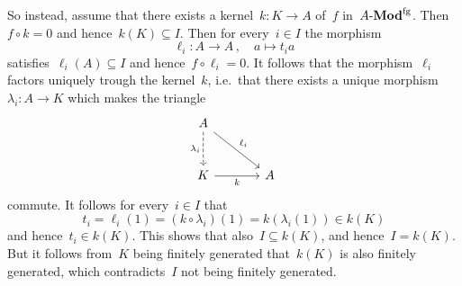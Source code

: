 \begin{example}
\begin{enumerate}
      So instead, assume that there exists a kernel~$k \colon K \to A$ of~$f$ in~$\text{$A$-$\mathbf{Mod}^{\mathrm{fg}}$}$.
      Then~$f \circ k = 0$ and hence~$k(K) \subseteq I$.
      Then for every~$i \in I$ the morphism
      \[
                \ell_i
        \colon  A
        \to     A \,,
        \quad   a
        \mapsto t_i a
      \]
      satisfies~$\ell_i(A) \subseteq I$ and hence~$f \circ \ell_i = 0$.
      It follows that the morphism~$\ell_i$ factors uniquely trough the kernel~$k$, i.e.\ that there exists a unique morphism~$\lambda_i \colon A \to K$ which makes the triangle
      \[
        \begin{tikzcd}[sep = large]
            A
            \arrow[dashed]{d}[left]{\lambda_i}
            \arrow{dr}[above right]{\ell_i}
          & {}
          \\
            K
            \arrow{r}[below]{k}
          & A
        \end{tikzcd}
      \]
      commute.
      It follows for every~$i \in I$ that
      \[
            t_i
        =   \ell_i(1)
        =   (k \circ \lambda_i)(1)
        =   k(\lambda_i(1))
        \in k(K)
      \]
      and hence~$t_i \in k(K)$.
      This shows that also~$I \subseteq k(K)$, and hence~$I = k(K)$.
      But it follows from~$K$ being finitely generated that~$k(K)$ is also finitely generated, which contradicts~$I$ not being finitely generated.
  \end{enumerate}
\end{example}




